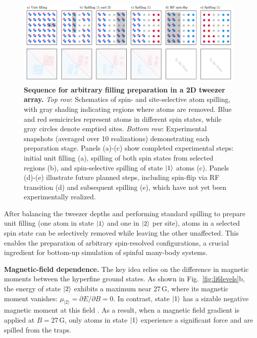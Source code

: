 
\begin{figure}
    \centering
    \includegraphics{fig-ai/preparation-array-ai.pdf}
    \caption{
    \textbf{Sequence for arbitrary filling preparation in a 2D tweezer array.}
    \textit{Top row}: Schematics of spin- and site-selective atom spilling, with gray shading indicating regions where atoms are removed. Blue and red semicircles represent atoms in different spin states, while gray circles denote emptied sites.
    \textit{Bottom row}: Experimental snapshots (averaged over 10 realizations) demonstrating each preparation stage. Panels (a)-(c) show completed experimental steps: initial unit filling (a), spilling of both spin states from selected regions (b), and spin-selective spilling of state $\left| 1 \right\rangle$ atoms (c). Panels (d)-(e) illustrate future planned steps, including spin-flip via RF transition (d) and subsequent spilling (e), which have not yet been experimentally realized.
    }
    \label{fig:preparation-array}
\end{figure}




After balancing the tweezer depths and performing standard spilling to prepare unit filling (one atom in state $\left| 1 \right\rangle$ and one in $\left| 2 \right\rangle$ per site), atoms in a selected spin state can be selectively removed while leaving the other unaffected. This enables the preparation of arbitrary spin-resolved configurations, a crucial ingredient for bottom-up simulation of spinful many-body systems.

\textbf{Magnetic-field dependence.}
The key idea relies on the difference in magnetic moments between the hyperfine ground states. As shown in Fig.~\ref{fig:li6levels}b, the energy of state $\left| 2 \right\rangle$ exhibits a maximum near $27\,\mathrm{G}$, where its magnetic moment vanishes: $\mu_{|2\rangle} = \partial E / \partial B = 0$. In contrast, state $\left| 1 \right\rangle$ has a sizable negative magnetic moment at this field . As a result, when a magnetic field gradient is applied at $B = 27\,\mathrm{G}$, only atoms in state $\left| 1 \right\rangle$ experience a significant force and are spilled from the traps.

